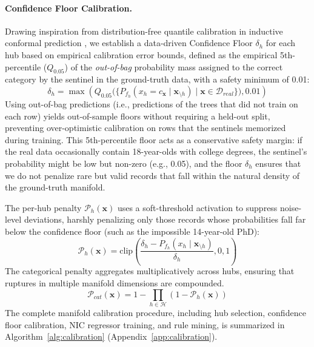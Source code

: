 \documentclass[pdflatex,sn-mathphys-num]{sn-jnl}
\theoremstyle{thmstyleone}%
\theoremstyle{thmstyletwo}%
\theoremstyle{thmstylethree}%
\begin{document}
\paragraph{Confidence Floor Calibration.}
Drawing inspiration from distribution-free quantile calibration in inductive conformal prediction \cite{shafer2008tutorial, vovk2005algorithmic, angelopoulos2021gentle}, we establish a data-driven Confidence Floor $\delta_h$ for each hub based on empirical calibration error bounds, defined as the empirical 5th-percentile ($Q_{0.05}$) of the \emph{out-of-bag} probability mass assigned to the correct category by the sentinel in the ground-truth data, with a safety minimum of 0.01:
\begin{equation}
    \delta_h = \max \left( Q_{0.05} \Big( \{ P_{f_h}(x_h = c_{\mathbf{x}} \mid \mathbf{x}_{\setminus h}) \mid \mathbf{x} \in \mathcal{D}_{real} \} \Big), 0.01 \right)
\end{equation}
Using out-of-bag predictions (i.e., predictions of the trees that did not train on each row) yields out-of-sample floors without requiring a held-out split, preventing over-optimistic calibration on rows that the sentinels memorized during training. This 5th-percentile floor acts as a conservative safety margin: if the real data occasionally contain 18-year-olds with college degrees, the sentinel's probability might be low but non-zero (e.g., 0.05), and the floor $\delta_h$ ensures that we do not penalize rare but valid records that fall within the natural density of the ground-truth manifold.

The per-hub penalty $\mathcal{P}_h(\mathbf{x})$ uses a soft-threshold activation to suppress noise-level deviations, harshly penalizing only those records whose probabilities fall far below the confidence floor (such as the impossible 14-year-old PhD):
\begin{equation}
    \mathcal{P}_h(\mathbf{x}) = \text{clip}\left( \frac{\delta_h - P_{f_h}(x_h \mid \mathbf{x}_{\setminus h})}{\delta_h}, 0, 1 \right)
\end{equation}
The categorical penalty aggregates multiplicatively across hubs, ensuring that ruptures in multiple manifold dimensions are compounded.
\begin{equation}
    \mathcal{P}_{cat}(\mathbf{x}) = 1 - \prod_{h \in \mathcal{H}} (1 - \mathcal{P}_h(\mathbf{x}))
\end{equation}
The complete manifold calibration procedure, including hub selection, confidence floor calibration, NIC regressor training, and rule mining, is summarized in Algorithm~\ref{alg:calibration} (Appendix~\ref{app:calibration}).
\end{document}
